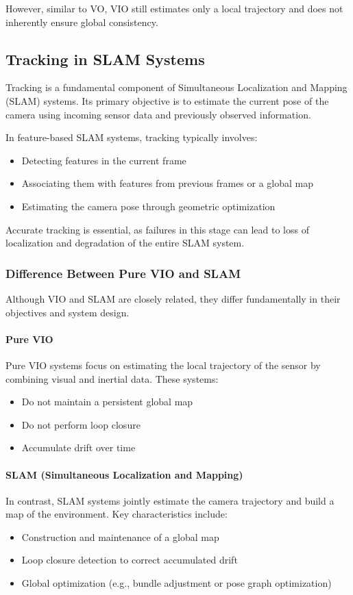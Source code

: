 \documentclass[english, cd=nocolor, cdfont=off, fontsize=11pt]{tudscrreprt}
\begin{document}
However, similar to VO, VIO still estimates only a local trajectory and does not inherently ensure global consistency.

\subsection{Tracking in SLAM Systems}

Tracking is a fundamental component of Simultaneous Localization and Mapping (SLAM) systems. Its primary objective is to estimate the current pose of the camera using incoming sensor data and previously observed information.

In feature-based SLAM systems, tracking typically involves:
\begin{itemize}
    \item Detecting features in the current frame
    \item Associating them with features from previous frames or a global map
    \item Estimating the camera pose through geometric optimization
\end{itemize}

Accurate tracking is essential, as failures in this stage can lead to loss of localization and degradation of the entire SLAM system.

\subsubsection{Difference Between Pure VIO and SLAM}

Although VIO and SLAM are closely related, they differ fundamentally in their objectives and system design.

\paragraph{Pure VIO}
Pure VIO systems focus on estimating the local trajectory of the sensor by combining visual and inertial data. These systems:
\begin{itemize}
    \item Do not maintain a persistent global map
    \item Do not perform loop closure
    \item Accumulate drift over time
\end{itemize}

\paragraph{SLAM (Simultaneous Localization and Mapping)}
In contrast, SLAM systems jointly estimate the camera trajectory and build a map of the environment. Key characteristics include:
\begin{itemize}
    \item Construction and maintenance of a global map
    \item Loop closure detection to correct accumulated drift
    \item Global optimization (e.g., bundle adjustment or pose graph optimization)
\end{itemize}
\end{document}
